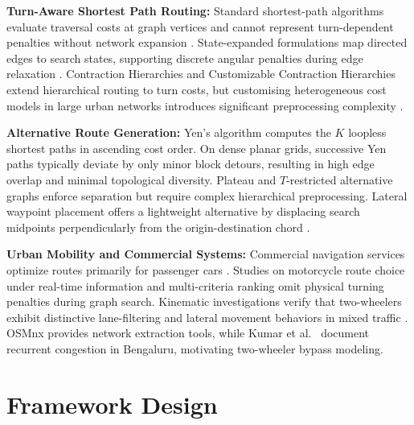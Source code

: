 \documentclass[11pt,conference]{IEEEtran}
\begin{document}
\noindent\textbf{Turn-Aware Shortest Path Routing:}
Standard shortest-path algorithms evaluate traversal costs at graph vertices and cannot represent turn-dependent penalties without network expansion \cite{winter2002modeling,geisberger2011efficient}.
State-expanded formulations map directed edges to search states, supporting discrete angular penalties during edge relaxation \cite{winter2002modeling}.
Contraction Hierarchies and Customizable Contraction Hierarchies extend hierarchical routing to turn costs, but customising heterogeneous cost models in large urban networks introduces significant preprocessing complexity \cite{geisberger2011efficient,bast2016route,delling2017customizable}.

\noindent\textbf{Alternative Route Generation:}
Yen's algorithm \cite{yen1971finding} computes the $K$ loopless shortest paths in ascending cost order.
On dense planar grids, successive Yen paths typically deviate by only minor block detours, resulting in high edge overlap and minimal topological diversity.
Plateau and $T$-restricted alternative graphs \cite{abraham2013alternative} enforce separation but require complex hierarchical preprocessing.
Lateral waypoint placement offers a lightweight alternative by displacing search midpoints perpendicularly from the origin-destination chord \cite{asvial2020entropy}.

\noindent\textbf{Urban Mobility and Commercial Systems:}
Commercial navigation services optimize routes primarily for passenger cars \cite{luxen2011realtime,kumar2025realtime}.
Studies on motorcycle route choice under real-time information \cite{fadilah2024identifying} and multi-criteria ranking \cite{asvial2020entropy} omit physical turning penalties during graph search.
Kinematic investigations verify that two-wheelers exhibit distinctive lane-filtering and lateral movement behaviors in mixed traffic \cite{kotagi2020modeling,das2019modeling,promraksa2022lane}.
OSMnx \cite{boeing2017osmnx} provides network extraction tools, while Kumar et al.\ \cite{kumar2025realtime} document recurrent congestion in Bengaluru, motivating two-wheeler bypass modeling.


\section{Framework Design}
\end{document}
